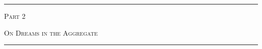 \documentclass[smalldemyvopaper,11pt,twoside,onecolumn,openright,extrafontsizes]{memoir}
\newcommand{\press}{}
\newlength\drop
\begin{document}









\mainmatter









\clearpage
\thispagestyle{empty}


\begin{center}
	\vspace*{\drop}
	\rule{\textwidth}{0in}\par
	{\HUGE\textsc{Part 2\\[1in]} \par}
	{\textsc{On Dreams in the Aggregate}\\[1in]}%
	\rule{\textwidth}{0in}\par
	\vfill
	{\Large\scshape\press}
\end{center}
\end{document}
